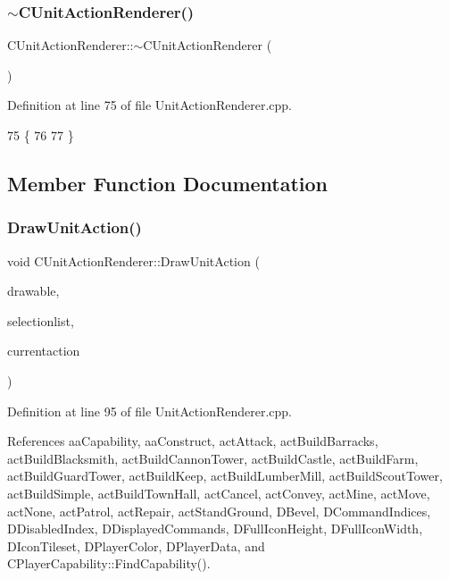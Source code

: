 \subsubsection{\texorpdfstring{$\sim$\+C\+Unit\+Action\+Renderer()}{~CUnitActionRenderer()}}
{\footnotesize\ttfamily C\+Unit\+Action\+Renderer\+::$\sim$\+C\+Unit\+Action\+Renderer (\begin{DoxyParamCaption}{ }\end{DoxyParamCaption})}



Definition at line 75 of file Unit\+Action\+Renderer.\+cpp.


\begin{DoxyCode}
75                                          \{
76     
77 \}
\end{DoxyCode}


\subsection{Member Function Documentation}
\hypertarget{classCUnitActionRenderer_aef690a560f7dca2c2cf9051eb4f8d71f}{}\label{classCUnitActionRenderer_aef690a560f7dca2c2cf9051eb4f8d71f} 
\subsubsection{\texorpdfstring{Draw\+Unit\+Action()}{DrawUnitAction()}}
{\footnotesize\ttfamily void C\+Unit\+Action\+Renderer\+::\+Draw\+Unit\+Action (\begin{DoxyParamCaption}\item[{Gdk\+Drawable $\ast$}]{drawable,  }\item[{const std\+::list$<$ std\+::weak\+\_\+ptr$<$ \hyperlink{classCPlayerAsset}{C\+Player\+Asset} $>$ $>$ \&}]{selectionlist,  }\item[{\hyperlink{GameDataTypes_8h_a35b98ce26aca678b03c6f9f76e4778ce}{E\+Asset\+Capability\+Type}}]{currentaction }\end{DoxyParamCaption})}



Definition at line 95 of file Unit\+Action\+Renderer.\+cpp.



References aa\+Capability, aa\+Construct, act\+Attack, act\+Build\+Barracks, act\+Build\+Blacksmith, act\+Build\+Cannon\+Tower, act\+Build\+Castle, act\+Build\+Farm, act\+Build\+Guard\+Tower, act\+Build\+Keep, act\+Build\+Lumber\+Mill, act\+Build\+Scout\+Tower, act\+Build\+Simple, act\+Build\+Town\+Hall, act\+Cancel, act\+Convey, act\+Mine, act\+Move, act\+None, act\+Patrol, act\+Repair, act\+Stand\+Ground, D\+Bevel, D\+Command\+Indices, D\+Disabled\+Index, D\+Displayed\+Commands, D\+Full\+Icon\+Height, D\+Full\+Icon\+Width, D\+Icon\+Tileset, D\+Player\+Color, D\+Player\+Data, and C\+Player\+Capability\+::\+Find\+Capability().


